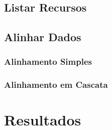 \subsection{Listar Recursos}
\subsection{Alinhar Dados}
\subsubsection{Alinhamento Simples}
\subsubsection{Alinhamento em Cascata}

\section{Resultados}

